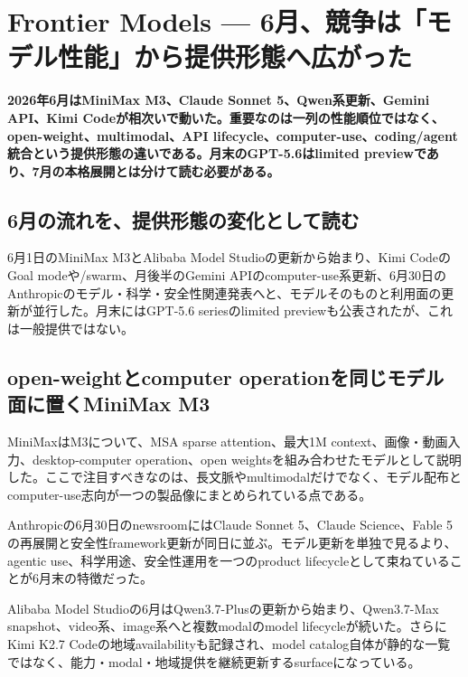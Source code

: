 \section{Frontier Models — 6月、競争は「モデル性能」から提供形態へ広がった}
\label{pkg:frontier-models-june}
\noindent\textbf{2026年6月はMiniMax M3、Claude Sonnet 5、Qwen系更新、Gemini API、Kimi Codeが相次いで動いた。重要なのは一列の性能順位ではなく、open-weight、multimodal、API lifecycle、computer-use、coding/agent統合という提供形態の違いである。月末のGPT-5.6はlimited previewであり、7月の本格展開とは分けて読む必要がある。}\autocite{src-9191d43918fc,src-a24fd97eb3d0,src-d8e13386974c,src-eac8dfbeb78c,src-f6aa679babd7}

\subsection{6月の流れを、提供形態の変化として読む}

6月1日のMiniMax M3とAlibaba Model Studioの更新から始まり、Kimi CodeのGoal modeや/swarm、月後半のGemini APIのcomputer-use系更新、6月30日のAnthropicのモデル・科学・安全性関連発表へと、モデルそのものと利用面の更新が並行した。月末にはGPT-5.6 seriesのlimited previewも公表されたが、これは一般提供ではない。\autocite{src-30f48121decc,src-9191d43918fc,src-a24fd97eb3d0,src-d8e13386974c,src-eac8dfbeb78c,src-f6aa679babd7}


\subsection{open-weightとcomputer operationを同じモデル面に置くMiniMax M3}

MiniMaxはM3について、MSA sparse attention、最大1M context、画像・動画入力、desktop-computer operation、open weightsを組み合わせたモデルとして説明した。ここで注目すべきなのは、長文脈やmultimodalだけでなく、モデル配布とcomputer-use志向が一つの製品像にまとめられている点である。\autocite{src-d8e13386974c}


Anthropicの6月30日のnewsroomにはClaude Sonnet 5、Claude Science、Fable 5の再展開と安全性framework更新が同日に並ぶ。モデル更新を単独で見るより、agentic use、科学用途、安全性運用を一つのproduct lifecycleとして束ねていることが6月末の特徴だった。\autocite{src-f6aa679babd7}


Alibaba Model Studioの6月はQwen3.7-Plusの更新から始まり、Qwen3.7-Max snapshot、video系、image系へと複数modalのmodel lifecycleが続いた。さらにKimi K2.7 Codeの地域availabilityも記録され、model catalog自体が静的な一覧ではなく、能力・modal・地域提供を継続更新するsurfaceになっている。\autocite{src-eac8dfbeb78c}


